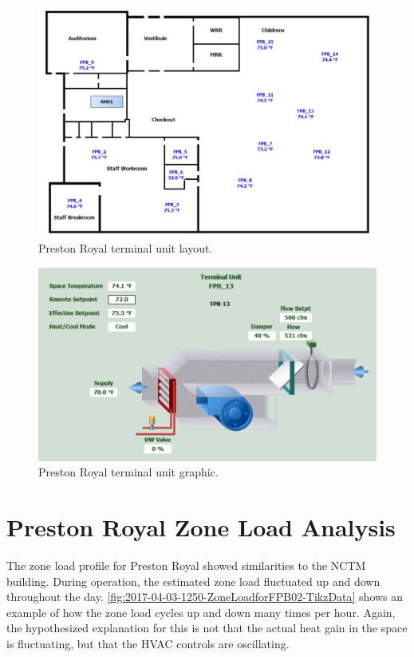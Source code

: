 \begin{figure}
\centering
\includegraphics[width=\textwidth]{Images/PrestonRoyalFPBLayoutGraphic.PNG}
\caption{Preston Royal terminal unit layout.}
\label{fig:PrestonRoyalTerminalUnitLayout}
\end{figure}

\begin{figure}
\centering
\includegraphics[width=\textwidth]{Images/PrestonRoyalTerminalUnitGraphic.PNG}
\caption{Preston Royal terminal unit graphic. }
\label{fig:PrestonRoyalTerminalUnitGraphic}
\end{figure}



\section{Preston Royal Zone Load Analysis}

The zone load profile for Preston Royal showed similarities to the NCTM
building. During operation, the estimated zone load fluctuated up and
down throughout the day. \figref{}
\ref{fig:2017-04-03-1250-ZoneLoadforFPB02-TikzData} shows an example of
how the zone load cycles up and down many times per hour. Again, the
hypothesized explanation for this is not that the actual heat gain in
the space is fluctuating, but that the HVAC controls are oscillating. 

